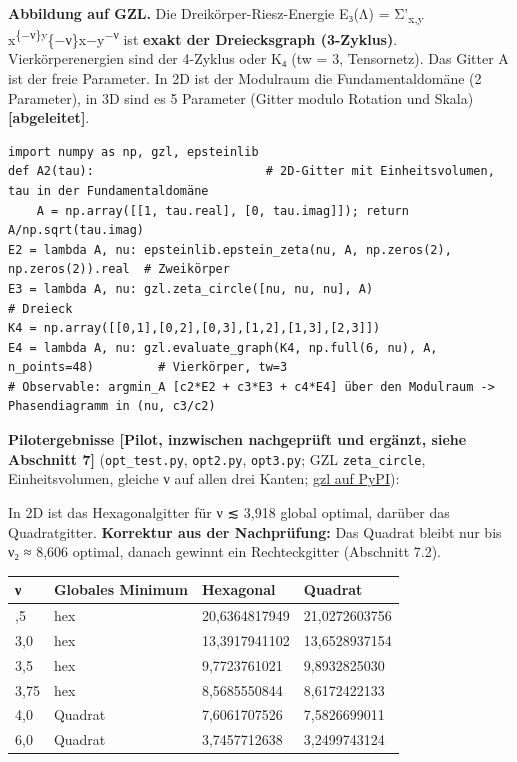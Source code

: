 \textbf{Abbildung auf GZL.} Die Dreikörper-Riesz-Energie E₃(Λ) = Σ'\textsubscript{x,y} \textbar x\textbar{}\textsuperscript{\{−ν\}\textbar y\textbar{}}\{−ν\}\textbar x−y\textbar{}\textsuperscript{−ν} ist \textbf{exakt der Dreiecksgraph (3-Zyklus)}. Vierkörperenergien sind der 4-Zyklus oder K₄ (tw = 3, Tensornetz). Das Gitter A ist der freie Parameter. In 2D ist der Modulraum die Fundamentaldomäne (2 Parameter), in 3D sind es 5 Parameter (Gitter modulo Rotation und Skala) \textbf{{[}abgeleitet{]}}.

\begin{verbatim}
import numpy as np, gzl, epsteinlib
def A2(tau):                        # 2D-Gitter mit Einheitsvolumen, tau in der Fundamentaldomäne
    A = np.array([[1, tau.real], [0, tau.imag]]); return A/np.sqrt(tau.imag)
E2 = lambda A, nu: epsteinlib.epstein_zeta(nu, A, np.zeros(2), np.zeros(2)).real  # Zweikörper
E3 = lambda A, nu: gzl.zeta_circle([nu, nu, nu], A)                               # Dreieck
K4 = np.array([[0,1],[0,2],[0,3],[1,2],[1,3],[2,3]])
E4 = lambda A, nu: gzl.evaluate_graph(K4, np.full(6, nu), A, n_points=48)         # Vierkörper, tw=3
# Observable: argmin_A [c2*E2 + c3*E3 + c4*E4] über den Modulraum -> Phasendiagramm in (nu, c3/c2)
\end{verbatim}

\textbf{Pilotergebnisse {[}Pilot, inzwischen nachgeprüft und ergänzt, siehe Abschnitt 7{]}} (\texttt{opt\_test.py}, \texttt{opt2.py}, \texttt{opt3.py}; GZL \texttt{zeta\_circle}, Einheitsvolumen, gleiche ν auf allen drei Kanten; \href{https://pypi.org/project/gzl/}{gzl auf PyPI}):

In 2D ist das Hexagonalgitter für ν ≲ 3,918 global optimal, darüber das Quadratgitter. \textbf{Korrektur aus der Nachprüfung:} Das Quadrat bleibt nur bis ν₂ ≈ 8,606 optimal, danach gewinnt ein Rechteckgitter (Abschnitt 7.2).

\begin{longtable}[]{@{}llll@{}}
\toprule\noalign{}
ν & Globales Minimum & Hexagonal & Quadrat \\
\midrule\noalign{}
\endhead
\bottomrule\noalign{}
\endlastfoot
2,5 & hex & 20,6364817949 & 21,0272603756 \\
3,0 & hex & 13,3917941102 & 13,6528937154 \\
3,5 & hex & 9,7723761021 & 9,8932825030 \\
3,75 & hex & 8,5685550844 & 8,6172422133 \\
4,0 & Quadrat & 7,6061707526 & 7,5826699011 \\
6,0 & Quadrat & 3,7457712638 & 3,2499743124 \\
\end{longtable}

